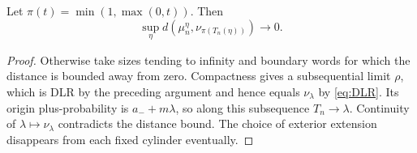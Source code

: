 \begin{lemma}\label{lem:calibration}
Let $\pi(t)=\min(1,\max(0,t))$. Then
\[
 \sup_\eta d(\mu_n^\eta,\nu_{\pi(T_n(\eta))})\longrightarrow0.
\]
\end{lemma}
\begin{proof}
Otherwise take sizes tending to infinity and boundary words for which the distance is bounded away from zero. Compactness gives a subsequential limit $\rho$, which is DLR by the preceding argument and hence equals $\nu_\lambda$ by \eqref{eq:DLR}. Its origin plus-probability is $a_-+m\lambda$, so along this subsequence $T_n\to\lambda$. Continuity of $\lambda\mapsto\nu_\lambda$ contradicts the distance bound. The choice of exterior extension disappears from each fixed cylinder eventually.
\end{proof}

